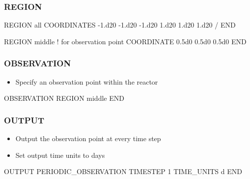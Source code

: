 \documentclass{beamer}
\newcommand\bluecomment[1]{{{\color{blue} #1}}}
\begin{document}
\begin{frame}[fragile]\frametitle{REGION}

\begin{semiverbatim}

REGION all
  COORDINATES
    -1.d20 -1.d20 -1.d20
    1.d20 1.d20 1.d20
  /
END

REGION middle   \bluecomment{! for observation point}
  COORDINATE 0.5d0 0.5d0 0.5d0
END

\end{semiverbatim}

\end{frame}

\begin{frame}[fragile]\frametitle{OBSERVATION}

\begin{itemize}
  \item Specify an observation point within the reactor
\end{itemize}

\begin{semiverbatim}


OBSERVATION
  REGION middle
END

\end{semiverbatim}

\end{frame}

\begin{frame}[fragile]\frametitle{OUTPUT}

\begin{itemize}
\item Output the observation point at every time step
\item Set output time units to days
\end{itemize}


\begin{semiverbatim}

OUTPUT
  PERIODIC_OBSERVATION TIMESTEP 1
  TIME_UNITS d
END
\end{semiverbatim}

\end{frame}
\end{document}
